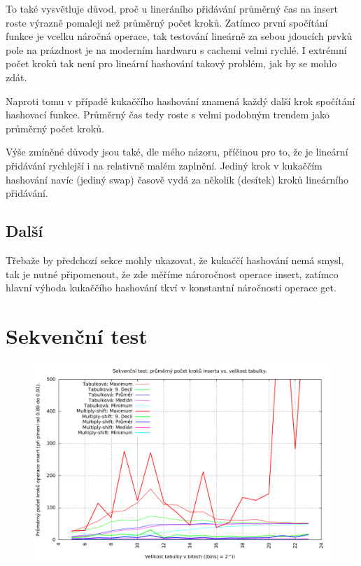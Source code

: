 \documentclass[12pt,a4paper]{report}
\begin{document}
To také vysvětluje důvod, proč u lineráního přidávání průměrný čas na insert roste výrazně pomaleji než průměrný počet kroků. Zatímco první spočítání funkce je vcelku náročná operace, tak testování lineárně za sebou jdoucích prvků pole na prázdnost je na moderním hardwaru s cachemi velmi rychlé. I extrémní počet kroků tak není pro lineární hashování takový problém, jak by se mohlo zdát.

Naproti tomu v případě kukaččího hashování znamená každý další krok spočítání hashovací funkce. Průměrný čas tedy roste s velmi podobným trendem jako průměrný počet kroků.

Výše zmíněné důvody jsou také, dle mého názoru, příčinou pro to, že je lineární přidávání rychlejší i na relativně malém zaplnění. Jediný krok v kukaččím hashování navíc (jediný swap) časově vydá za několik (desítek) kroků lineárního přidávání.

	\subsection{Další}
Třebaže by předchozí sekce mohly ukazovat, že kukaččí hashování nemá smysl, tak je nutné připomenout, že zde měříme nároročnost operace insert, zatímco hlavní výhoda kukaččího hashování tkví v konstantní náročnosti operace get. 
	
	\section{Sekvenční test}
	
		\begin{figure}[h]	
		\centering	
		\includegraphics[scale=0.6]{graph_seq_both}		
	\end{figure}
	
\end{document}
